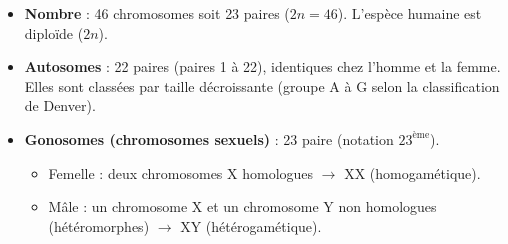 \documentclass[11pt]{article}
\newcommand{\cle}[1]{{\popxbold\color{popdark}#1}}
\begin{document}
\begin{propriete}
\begin{itemize}
\item \textbf{Nombre} : \cle{46 chromosomes} soit \cle{23 paires} ($2n = 46$). L'espèce humaine est \cle{diploïde} ($2n$).
\item \textbf{Autosomes} : 22 paires (paires 1 à 22), identiques chez l'homme et la femme. Elles sont classées par taille décroissante (groupe A à G selon la classification de Denver).
\item \textbf{Gonosomes (chromosomes sexuels)} : 23\ieme{} paire (notation $23^{\text{ème}}$).
  \begin{itemize}
  \item Femelle : deux chromosomes X homologues $\rightarrow$ \cle{XX} (homogamétique).
  \item Mâle : un chromosome X et un chromosome Y non homologues (hétéromorphes) $\rightarrow$ \cle{XY} (hétérogamétique).
  \end{itemize}
\end{itemize}
\end{propriete}
\end{document}
